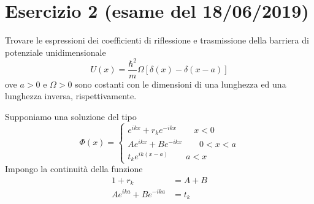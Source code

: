 \documentclass[a4paper]{article}
\begin{document}
    \section*{Esercizio 2 (esame del 18/06/2019)}
        Trovare le espressioni dei coefficienti di riflessione e trasmissione della barriera di potenziale unidimensionale
        \begin{equation*}
            U(x)=\frac{\hbar^2}{m}\Omega\left[\delta(x)-\delta(x-a)\right]
        \end{equation*}
        ove $a > 0$ e $\Omega > 0$ sono costanti con le dimensioni di una lunghezza ed una lunghezza inversa, rispettivamente.
        \begin{figure}[H]
            \centering
        \end{figure}
        Supponiamo una soluzione del tipo
        \begin{equation*}
            \Phi(x)=
            \begin{cases}
                e^{ikx}+r_ke^{-ikx} \quad\quad x<0\\
                Ae^{ikx}+Be^{-ikx} \quad\quad 0<x<a\\
                t_ke^{ik(x-a)} \quad\quad a<x
            \end{cases}
        \end{equation*}
        Impongo la continuità della funzione
        \begin{equation*}
            \begin{split}
                1+r_k&=A+B\\
                Ae^{ika}+Be^{-ika}&=t_k
            \end{split}
        \end{equation*}
\end{document}
